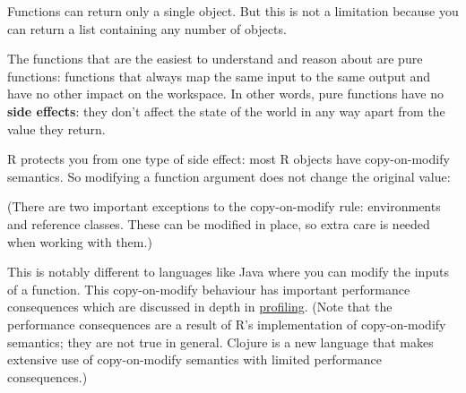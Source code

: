 \begin{Shaded}
\begin{Highlighting}[]
\StringTok{ }

\NormalTok{\}}
\end{Highlighting}
\end{Shaded}

Functions can return only a single object. But this is not a limitation
because you can return a list containing any number of objects.

The functions that are the easiest to understand and reason about are
pure functions: functions that always map the same input to the same
output and have no other impact on the workspace. In other words, pure
functions have no \textbf{side effects}: they don't affect the state of
the world in any way apart from the value they return.

R protects you from one type of side effect: most R objects have
copy-on-modify semantics. So modifying a function argument does not
change the original value: 

\begin{Shaded}
\begin{Highlighting}[]
\StringTok{ }
  \StringTok{ }
\NormalTok{\}}
\StringTok{ }\NormalTok{(} \NormalTok{)}
\end{Highlighting}
\end{Shaded}

(There are two important exceptions to the copy-on-modify rule:
environments and reference classes. These can be modified in place, so
extra care is needed when working with them.)

This is notably different to languages like Java where you can modify
the inputs of a function. This copy-on-modify behaviour has important
performance consequences which are discussed in depth in
\hyperref[profiling]{profiling}. (Note that the performance consequences
are a result of R's implementation of copy-on-modify semantics; they are
not true in general. Clojure is a new language that makes extensive use
of copy-on-modify semantics with limited performance consequences.)

